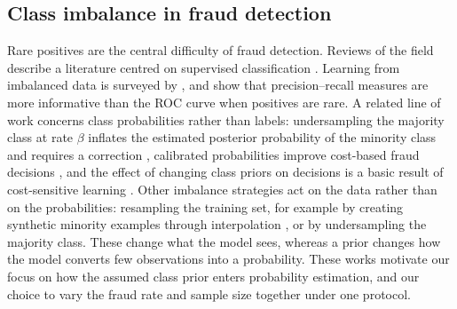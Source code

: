 \documentclass[final,5p,times,authoryear]{elsarticle}
\begin{document}
\subsection{Class imbalance in fraud detection}
Rare positives are the central difficulty of fraud detection. Reviews of the field describe a literature centred on supervised classification \citep{west2016,ali2022}. Learning from imbalanced data is surveyed by \citet{he2009}, and \citet{saito2015} show that precision--recall measures are more informative than the ROC curve when positives are rare. A related line of work concerns class probabilities rather than labels: undersampling the majority class at rate $\beta$ inflates the estimated posterior probability of the minority class and requires a correction \citep{dalpozzolo2015}, calibrated probabilities improve cost-based fraud decisions \citep{correa2014}, and the effect of changing class priors on decisions is a basic result of cost-sensitive learning \citep{elkan2001}. Other imbalance strategies act on the data rather than on the probabilities: resampling the training set, for example by creating synthetic minority examples through interpolation \citep{chawla2002}, or by undersampling the majority class. These change what the model sees, whereas a prior changes how the model converts few observations into a probability. These works motivate our focus on how the assumed class prior enters probability estimation, and our choice to vary the fraud rate and sample size together under one protocol.
\end{document}
